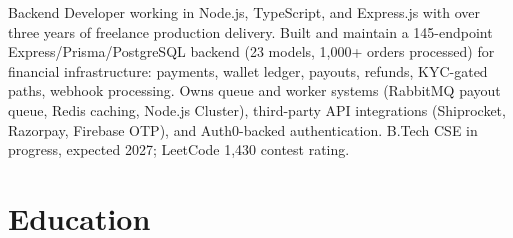 \documentclass[11pt,a4paper,sans]{moderncv}
\begin{document}
\makecvtitle


\vspace{2pt}
\small{Backend Developer working in Node.js, TypeScript, and Express.js with over three years of freelance production delivery. Built and maintain a 145-endpoint Express/Prisma/PostgreSQL backend (23 models, 1,000+ orders processed) for financial infrastructure: payments, wallet ledger, payouts, refunds, KYC-gated paths, webhook processing. Owns queue and worker systems (RabbitMQ payout queue, Redis caching, Node.js Cluster), third-party API integrations (Shiprocket, Razorpay, Firebase OTP), and Auth0-backed authentication. B.Tech CSE in progress, expected 2027; LeetCode 1,430 contest rating.}


\section{Education}
\vspace{1pt}

\end{document}
